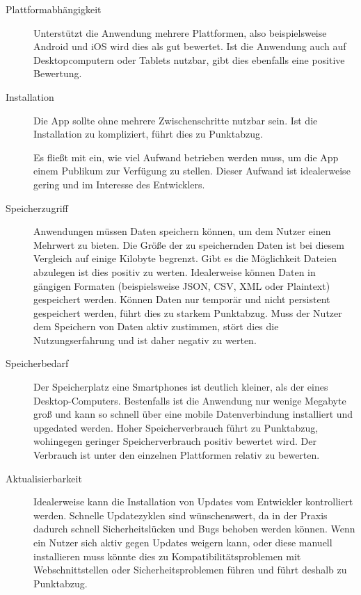 \begin{description}
	\item [Plattformabhängigkeit] 
		  Unterstützt die Anwendung mehrere Plattformen, also beispielsweise Android und iOS wird dies als gut bewertet. Ist die Anwendung auch auf Desktopcomputern oder Tablets nutzbar, gibt dies ebenfalls eine positive Bewertung.
		  
	\item [Installation]
	      Die App sollte ohne mehrere Zwischenschritte nutzbar sein. Ist die Installation zu kompliziert, führt dies zu Punktabzug.

	      Es fließt mit ein, wie viel Aufwand betrieben werden muss, um die App einem Publikum zur Verfügung zu stellen. Dieser Aufwand ist idealerweise gering und im Interesse des Entwicklers.

	\item [Speicherzugriff]
	      Anwendungen müssen Daten speichern können, um dem Nutzer einen Mehrwert zu bieten. Die Größe der zu speichernden Daten ist bei diesem Vergleich auf einige Kilobyte begrenzt. Gibt es die Möglichkeit Dateien abzulegen ist dies positiv zu werten. Idealerweise können Daten in gängigen Formaten (beispielsweise JSON, CSV, XML oder Plaintext) gespeichert werden.
	      Können Daten nur temporär und nicht persistent gespeichert werden, führt dies zu starkem Punktabzug. Muss der Nutzer dem Speichern von Daten aktiv zustimmen, stört dies die Nutzungserfahrung und ist daher negativ zu werten.

	\item [Speicherbedarf]
	      Der Speicherplatz eine Smartphones ist deutlich kleiner, als der eines Desktop-Computers. Bestenfalls ist die Anwendung nur wenige Megabyte groß und kann so schnell über eine mobile Datenverbindung installiert und upgedated werden.
	      Hoher Speicherverbrauch führt zu Punktabzug, wohingegen geringer Speicherverbrauch positiv bewertet wird. Der Verbrauch ist unter den einzelnen Plattformen relativ zu bewerten.

	\item [Aktualisierbarkeit]
	      Idealerweise kann die Installation von Updates vom Entwickler kontrolliert werden. Schnelle Updatezyklen sind wünschenswert, da in der Praxis dadurch schnell Sicherheitslücken und Bugs behoben werden können. Wenn ein Nutzer sich aktiv gegen Updates weigern kann, oder diese manuell installieren muss könnte dies zu Kompatibilitätsproblemen mit Webschnittstellen oder Sicherheitsproblemen führen und führt deshalb zu Punktabzug.


\end{description}
